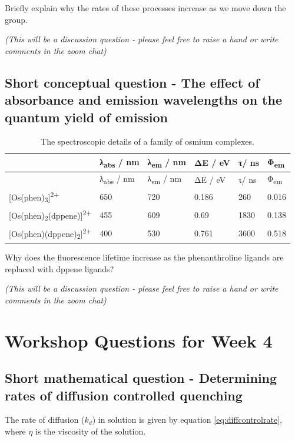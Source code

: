 \documentclass[
]{book}
\begin{document}
Briefly explain why the rates of these processes increase as we move down the group.

\emph{(This will be a discussion question - please feel free to raise a hand or write comments in the zoom chat)}

\hypertarget{sec:osphen}{%
\section{Short conceptual question - The effect of absorbance and emission wavelengths on the quantum yield of emission}\label{sec:osphen}}

\begin{longtable}[]{@{}llllll@{}}
\caption{\label{tab:osphen} The spectroscopic details of a family of osmium complexes.}\tabularnewline
\toprule
& λ\textsubscript{abs} / nm & λ\textsubscript{em} / nm & ΔE / eV & τ/ ns & Φ\textsubscript{em}\tabularnewline
\midrule
\endfirsthead
\toprule
& λ\textsubscript{abs} / nm & λ\textsubscript{em} / nm & ΔE / eV & τ/ ns & Φ\textsubscript{em}\tabularnewline
\midrule
\endhead
{[}Os(phen)\textsubscript{3}{]}\textsuperscript{2+} & 650 & 720 & 0.186 & 260 & 0.016\tabularnewline
{[}Os(phen)\textsubscript{2}(dppene){]}\textsuperscript{2+} & 455 & 609 & 0.69 & 1830 & 0.138\tabularnewline
{[}Os(phen)(dppene)\textsubscript{2}{]}\textsuperscript{2+} & 400 & 530 & 0.761 & 3600 & 0.518\tabularnewline
\bottomrule
\end{longtable}

Why does the fluorescence lifetime increase as the phenanthroline ligands are replaced with dppene ligands?

\emph{(This will be a discussion question - please feel free to raise a hand or write comments in the zoom chat)}

\hypertarget{ch:Workshop4}{%
\chapter{Workshop Questions for Week 4}\label{ch:Workshop4}}

\hypertarget{sec:diffcontrol}{%
\section{Short mathematical question - Determining rates of diffusion controlled quenching}\label{sec:diffcontrol}}

The rate of diffusion (\(k_d\)) in solution is given by equation \eqref{eq:diffcontrolrate}, where \(\eta\) is the viscosity of the solution.
\end{document}
